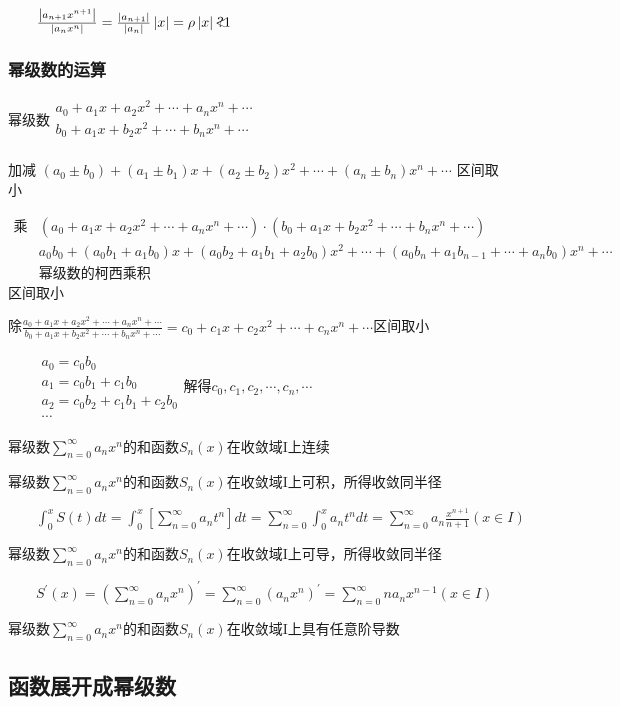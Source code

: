 \documentclass[UTF8]{ctexart}
\newcommand{\mt}[1]{\text{#1}}
\newcommand{\mda}[1]{$\displaystyle{ #1 }$}
\newcommand{\mf}[1]{\left( #1\right)}
\newcommand{\mfa}[1]{\left| #1\right|}
\newcommand{\mfc}[1]{\left[ #1 \right]}
\newcommand{\q}{\quad}
\newcommand{\ma}[1]{\begin{array}{llll} #1 \end{array}}
\newcommand{\jisu}[1]{\sum_{n=0}^\infty #1}
\def\isleq{\displaystyle{{<}\kern-6.5pt{?} }}
\begin{document}
$\q \q \frac{\mfa{a_{n+1}x^{n+1}}}{\mfa{a_nx^n}}=\frac{\mfa{a_{n+1}}}{\mfa{a_n}}\mfa{x}=\rho \mfa{x}\isleq 1$


\subsubsection{幂级数的运算}


幂级数$\ma{
    a_0+a_1x+a_2x^2+\cdots+a_nx^n+\cdots\\
    b_0+a_1x+b_2x^2+\cdots+b_nx^n+\cdots\\
}$


加减 $\mf{a_0 \pm b_0 }+\mf{a_1 \pm b_1}x+\mf{a_2 \pm b_2}x^2+\cdots+\mf{a_n \pm b_n}x^n+\cdots$ 区间取小

 $\ma{
\mt{乘} &\mf{a_0+a_1x+a_2x^2+\cdots+a_nx^n+\cdots}\cdot\mf{b_0+a_1x+b_2x^2+\cdots+b_nx^n+\cdots}\\
 &a_0b_0+\mf{a_0b_1+a_1b_0}x+\mf{a_0b_2+a_1b_1+a_2b_0}x^2+\cdots+\mf{a_0b_n+a_1b_{n-1}+\cdots+a_nb_0}x^n+\cdots\\
 &\mt{幂级数的柯西乘积}
}$区间取小

除$\frac{a_0+a_1x+a_2x^2+\cdots+a_nx^n+\cdots}{b_0+a_1x+b_2x^2+\cdots+b_nx^n+\cdots}=c_0+c_1x+c_2x^2+\cdots+c_nx^n+\cdots$区间取小

\mda{\q \q \ma{
    a_0=c_0b_0\\
    a_1=c_0b_1+c_1b_0\\
    a_2=c_0b_2+c_1b_1+c_2b_0\\
    \cdots
}}解得$c_0,c_1,c_2,\cdots,c_n,\cdots$


幂级数$\jisu{a_nx^n}$的和函数$S_n\mf{x}$在收敛域I上连续

幂级数$\jisu{a_nx^n}$的和函数$S_n\mf{x}$在收敛域I上可积，所得收敛同半径

\mda{\q\q \int_0^x S\mf{t}dt=\int_0^x \mfc{\jisu{a_nt^n}}dt=\jisu{\int_0^x a_nt^ndt=\jisu{a_n\frac{x^{n+1}}{n+1}}} \mf{x \in I}
}

幂级数$\jisu{a_nx^n}$的和函数$S_n\mf{x}$在收敛域I上可导，所得收敛同半径

\mda{\q\q S^{'}\mf{x}=\mf{\jisu{a_nx^n}}^{'}=\jisu{\mf{a_nx^n}^{'}}=\jisu{n a_nx^{n-1}} \mf{x \in I} }


幂级数$\jisu{a_nx^n}$的和函数$S_n\mf{x}$在收敛域I上具有任意阶导数





\subsection{函数展开成幂级数 }
\end{document}
